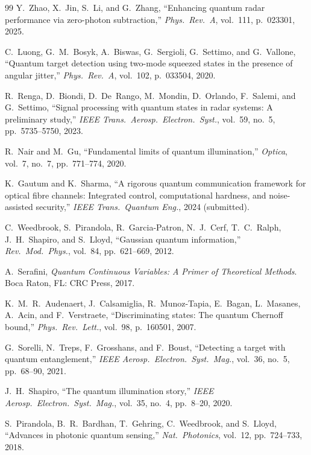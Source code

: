 \documentclass[journal]{IEEEtran}
\begin{document}
\begin{thebibliography}{99}
Y.~Zhao, X.~Jin, S.~Li, and G.~Zhang, ``Enhancing quantum radar performance via zero-photon subtraction,'' \textit{Phys.\ Rev.\ A}, vol.~111, p.~023301, 2025.

C.~Luong, G.~M.~Bosyk, A.~Biswas, G.~Sergioli, G.~Settimo, and G.~Vallone, ``Quantum target detection using two-mode squeezed states in the presence of angular jitter,'' \textit{Phys.\ Rev.\ A}, vol.~102, p.~033504, 2020.

R.~Renga, D.~Biondi, D.~De~Rango, M.~Mondin, D.~Orlando, F.~Salemi, and G.~Settimo, ``Signal processing with quantum states in radar systems: A preliminary study,'' \textit{IEEE Trans.\ Aerosp.\ Electron.\ Syst.}, vol.~59, no.~5, pp.~5735--5750, 2023.

R.~Nair and M.~Gu, ``Fundamental limits of quantum illumination,'' \textit{Optica}, vol.~7, no.~7, pp.~771--774, 2020.

K.~Gautum and K.~Sharma, ``A rigorous quantum communication framework for optical fibre channels: Integrated control, computational hardness, and noise-assisted security,'' \textit{IEEE Trans.\ Quantum Eng.}, 2024 (submitted).

C.~Weedbrook, S.~Pirandola, R.~Garcia-Patron, N.~J.~Cerf, T.~C.~Ralph, J.~H.~Shapiro, and S.~Lloyd, ``Gaussian quantum information,'' \textit{Rev.\ Mod.\ Phys.}, vol.~84, pp.~621--669, 2012.

A.~Serafini, \textit{Quantum Continuous Variables: A Primer of Theoretical Methods}. Boca Raton, FL: CRC Press, 2017.

K.~M.~R.~Audenaert, J.~Calsamiglia, R.~Munoz-Tapia, E.~Bagan, L.~Masanes, A.~Acin, and F.~Verstraete, ``Discriminating states: The quantum Chernoff bound,'' \textit{Phys.\ Rev.\ Lett.}, vol.~98, p.~160501, 2007.

G.~Sorelli, N.~Treps, F.~Grosshans, and F.~Boust, ``Detecting a target with quantum entanglement,'' \textit{IEEE Aerosp.\ Electron.\ Syst.\ Mag.}, vol.~36, no.~5, pp.~68--90, 2021.

J.~H.~Shapiro, ``The quantum illumination story,'' \textit{IEEE Aerosp.\ Electron.\ Syst.\ Mag.}, vol.~35, no.~4, pp.~8--20, 2020.

S.~Pirandola, B.~R.~Bardhan, T.~Gehring, C.~Weedbrook, and S.~Lloyd, ``Advances in photonic quantum sensing,'' \textit{Nat.\ Photonics}, vol.~12, pp.~724--733, 2018.


\end{thebibliography}
\end{document}
